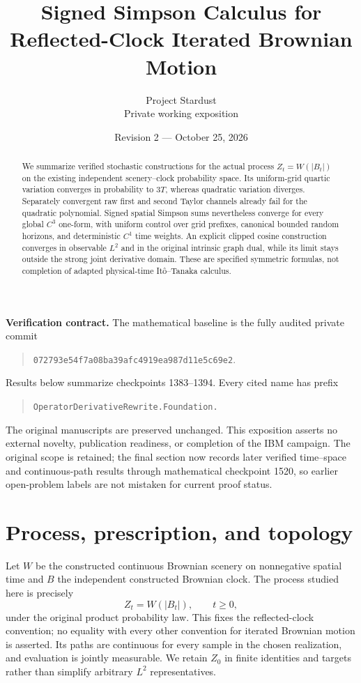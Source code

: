 \documentclass[11pt]{article}
\title{Signed Simpson Calculus for\protect\\
  Reflected-Clock Iterated Brownian Motion}
\author{Project Stardust\protect\\\small Private working exposition}
\date{Revision 2 --- October 25, 2026}
\theoremstyle{remark}
\begin{document}
\maketitle
\begin{abstract}
We summarize verified stochastic constructions for the actual process
$Z_t=W(|B_t|)$ on the existing independent scenery--clock probability space.
Its uniform-grid quartic variation converges in probability to $3T$, whereas
quadratic variation diverges. Separately convergent raw first and second
Taylor channels already fail for the quadratic polynomial. Signed spatial
Simpson sums nevertheless converge for every global $C^3$ one-form, with
uniform control over grid prefixes, canonical bounded random horizons, and
deterministic $C^1$ time weights. An explicit clipped cosine construction
converges in observable $L^2$ and in the original intrinsic graph dual, while
its limit stays outside the strong joint derivative domain. These are
specified symmetric formulas, not completion of adapted physical-time
It\^o--Tanaka calculus.
\end{abstract}

\noindent\textbf{Verification contract.}
The mathematical baseline is the fully audited private commit
\begin{quote}\small\texttt{072793e54f7a08ba39afc4919ea987d11e5c69e2}.\end{quote}
Results below summarize checkpoints 1383--1394. Every cited name has prefix
\begin{quote}\small\texttt{OperatorDerivativeRewrite.Foundation.}\end{quote}
The original manuscripts are preserved unchanged. This exposition asserts no
external novelty, publication readiness, or completion of the IBM campaign.
The original scope is retained; the final section now records later verified
time--space and continuous-path results through mathematical checkpoint 1520,
so earlier open-problem labels are not mistaken for current proof status.

\section{Process, prescription, and topology}\label{sec:model}
Let $W$ be the constructed continuous Brownian scenery on nonnegative spatial
time and $B$ the independent constructed Brownian clock. The process studied
here is precisely
\begin{equation}\label{eq:process}
 Z_t=W(|B_t|),\qquad t\geq0,
\end{equation}
under the original product probability law. This fixes the reflected-clock
convention; no equality with every other convention for iterated Brownian
motion is asserted. Its paths are continuous for every sample in the chosen
realization, and evaluation is jointly measurable. We retain $Z_0$ in finite
identities and targets rather than simplify arbitrary $L^2$ representatives.
\end{document}
